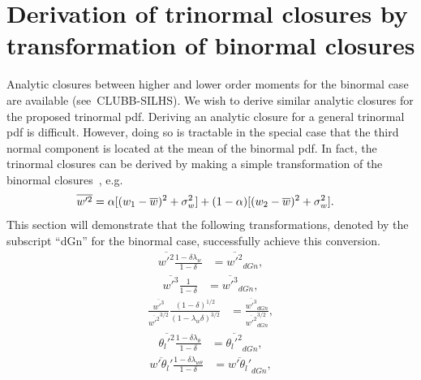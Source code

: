 \section{Derivation of trinormal closures by transformation of binormal closures}
\label{sec:derivation-of-trinormal-closures-by-transformation-of-binormal-closures}

Analytic closures between higher and lower order moments for the binormal case
are available (see~CLUBB-SILHS\autocite{larson2022clubbsilhs}).
We wish to derive similar analytic closures for the proposed trinormal \gls{pdf}.
Deriving an analytic closure for a general trinormal \gls{pdf} is difficult.
However, doing so is tractable in the special case that the third normal component
is located at the mean of the binormal \gls{pdf}.
In fact, the trinormal closures can be derived
by making a simple transformation of the binormal closures~\cite{larson2005using},
e.g.
\begin{align}
    \label{eq:wp2_bar_dGn}
    \overline{w'^2}
    &= \alpha [(w_1 - \overline{w})^2 + \sigma_w^2]
    + (1 - \alpha) [(w_2 - \overline{w})^2 + \sigma_w^2].
\end{align}
This section will demonstrate that the following transformations,
denoted by the subscript \enquote{dGn} for the binormal case,
successfully achieve this conversion.
\begin{align}
    \label{eq:w_prime_2_transform}
    \overline{w'^2} \frac{1 - \delta\lambda_w}{1 - \delta}
    &= \overline{w'^2}_{dGn},
\end{align}
\begin{align}
    \label{eq:w_prime_3_transform}
    \overline{w'^3} \frac{1}{1 - \delta}
    &= \overline{w'^3}_{dGn},
\end{align}
\begin{align}
    \label{eq:w_prime_3_div_w_prime_2_transform}
    \frac{\overline{w'^3}}{\overline{w'^2}^{3/2}} \frac{(1 - \delta)^{1/2}}{(1 - \lambda_w\delta)^{3/2}}
    &= \frac{\overline{w'^3}_{dGn}}{\overline{w'^2}_{dGn}^{3/2}},
\end{align}
\begin{align}
    \label{eq:theta_l_prime_transform}
    \overline{\theta_l'^2} \frac{1 - \delta\lambda_\theta}{1 - \delta}
    &= \overline{\theta_l'^2}_{dGn},
\end{align}
\begin{align}
    \label{eq:w_prime_theta_l_prime_transform}
    \overline{w'\theta_l'} \frac{1 - \delta\lambda_{w\theta}}{1 - \delta}
    &= \overline{w'\theta_l'}_{dGn},
\end{align}
